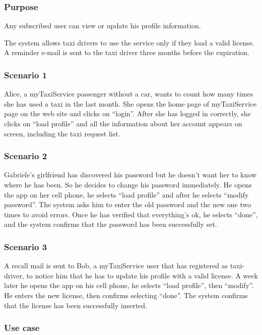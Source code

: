\label{user-profile}
\subsubsection{Purpose}
Any subscribed user can view or update his profile information.

The system allows taxi drivers to use the service only if they load a valid license. A reminder e-mail is sent to the taxi driver three months before the expiration.


\subsubsection{Scenario 1}
Alice, a myTaxiService passenger without a car, wants to count how many times she has used a taxi in the last month.
She opens the home page of myTaxiService page on the web site and clicks on ``login''.
After she has logged in correctly, she clicks on ``load profile'' and all the information about her account appears on screen, including the taxi request list.

\subsubsection{Scenario 2}
Gabriele's girlfriend has discovered his password but he doesn't want her to know where he has been. So he decides to change his password immediately. He opens the app on her cell phone, he selects ``load profile'' and after he selects ``modify password''. The system asks him to enter the old password and the new one two times to avoid errors. Once he has verified that everything's ok, he selects ``done'', and the system confirms that the password has been successfully set.

\subsubsection{Scenario 3}
A recall mail is sent to Bob, a myTaxiService user that has registered as taxi-driver, to notice him that he has to update his profile with a valid license. A week later he opens the app on his cell phone, he selects ``load profile'', then ``modify''. He enters the new license, then confirms selecting ``done''. The system confirms that the license has been successfully inserted.



\subsubsection{Use case}


